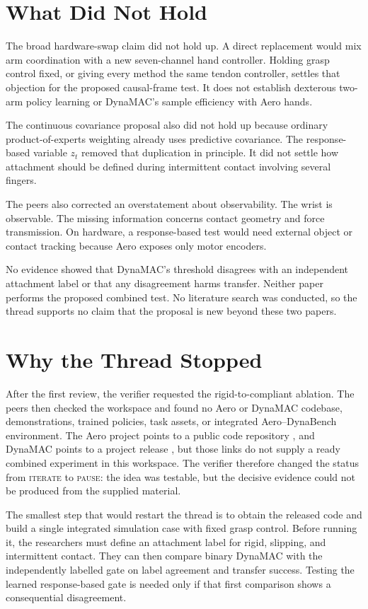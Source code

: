\documentclass{article}
\begin{document}
\section{What Did Not Hold}

The broad hardware-swap claim did not hold up. A direct replacement would mix arm coordination with a new seven-channel hand controller. Holding grasp control fixed, or giving every method the same tendon controller, settles that objection for the proposed causal-frame test. It does not establish dexterous two-arm policy learning or DynaMAC's sample efficiency with Aero hands.

The continuous covariance proposal also did not hold up because ordinary product-of-experts weighting already uses predictive covariance. The response-based variable $z_t$ removed that duplication in principle. It did not settle how attachment should be defined during intermittent contact involving several fingers.

The peers also corrected an overstatement about observability. The wrist is observable. The missing information concerns contact geometry and force transmission. On hardware, a response-based test would need external object or contact tracking because Aero exposes only motor encoders.

No evidence showed that DynaMAC's threshold disagrees with an independent attachment label or that any disagreement harms transfer. Neither paper performs the proposed combined test. No literature search was conducted, so the thread supports no claim that the proposal is new beyond these two papers.

\section{Why the Thread Stopped}

After the first review, the verifier requested the rigid-to-compliant ablation. The peers then checked the workspace and found no Aero or DynaMAC codebase, demonstrations, trained policies, task assets, or integrated Aero--DynaBench environment. The Aero project points to a public code repository \cite{aerocode}, and DynaMAC points to a project release \cite{dynamacrelease}, but those links do not supply a ready combined experiment in this workspace. The verifier therefore changed the status from \textsc{iterate} to \textsc{pause}: the idea was testable, but the decisive evidence could not be produced from the supplied material.

The smallest step that would restart the thread is to obtain the released code and build a single integrated simulation case with fixed grasp control. Before running it, the researchers must define an attachment label for rigid, slipping, and intermittent contact. They can then compare binary DynaMAC with the independently labelled gate on label agreement and transfer success. Testing the learned response-based gate is needed only if that first comparison shows a consequential disagreement.



\end{document}
